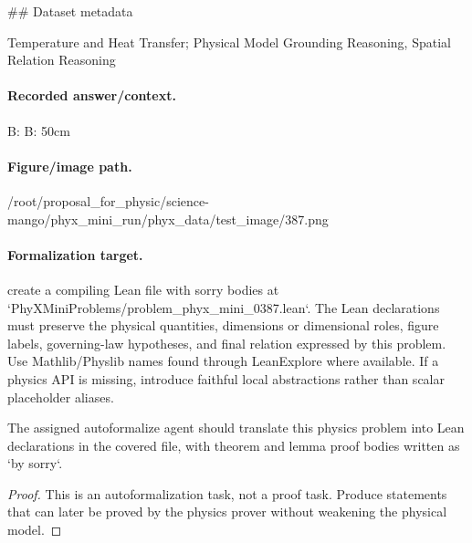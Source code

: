 \#\# Dataset metadata

Temperature and Heat Transfer; Physical Model Grounding Reasoning, Spatial Relation Reasoning

\paragraph{Recorded answer/context.}
B: B: 50cm

\paragraph{Figure/image path.}
/root/proposal\_for\_physic/science-mango/phyx\_mini\_run/phyx\_data/test\_image/387.png

\paragraph{Formalization target.}
create a compiling Lean file with sorry bodies at `PhyXMiniProblems/problem\_phyx\_mini\_0387.lean`. The Lean declarations must preserve the physical quantities, dimensions or dimensional roles, figure labels, governing-law hypotheses, and final relation expressed by this problem.
Use Mathlib/Physlib names found through LeanExplore where available. If a physics API is missing, introduce faithful local abstractions rather than scalar placeholder aliases.

\begin{theorem}
\label{thm:physics:phyx_mini_0387:target}
The assigned autoformalize agent should translate this physics problem into Lean declarations in the covered file, with theorem and lemma proof bodies written as `by sorry`.
\end{theorem}
\begin{proof}
This is an autoformalization task, not a proof task. Produce statements that can later be proved by the physics prover without weakening the physical model.
\end{proof}

